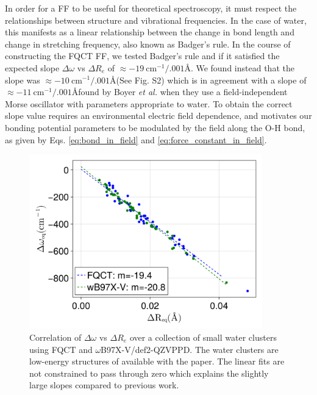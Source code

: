 \documentclass[journal=jctcce,manuscript=article]{achemso}
\begin{document}
In order for a FF to be useful for theoretical spectroscopy, it must respect the relationships between structure and vibrational frequencies. In the case of water, this manifests as a linear relationship between the change in bond length and change in  stretching frequency\cite{boyer2019beyond}, also known as Badger's rule.\cite{badger1934relation} In the course of constructing the FQCT FF, we tested Badger's rule and if it satisfied the expected slope $\Delta\omega$ vs $\Delta R_e$ of $\approx -19\ \mathrm{cm^{-1}/.001}$\AA\cite{boyer2019beyond}. We found instead that the slope was $\approx -10\ \mathrm{cm^{-1}/.001}$\AA (See Fig. S2) which is in agreement with a slope of $\approx -11\ \mathrm{cm^{-1}/.001}$\AA found by Boyer \textit{et al.} when they use a field-independent Morse oscillator with parameters appropriate to water. To obtain the correct slope value requires an environmental electric field dependence\cite{boyer2019beyond}, and motivates our bonding potential parameters to be modulated by the field along the O-H bond, as given by  Eqs. \ref{eq:bond_in_field} and \ref{eq:force_constant_in_field}. 
\begin{figure}[h]
  \includegraphics*[width=0.9\textwidth]{figures/badger_correlation_final.png}
  \caption{Correlation of $\Delta\omega$ vs $\Delta R_e$ over a collection
  of small water clusters using FQCT and $\omega$B97X-V/def2-QZVPPD.
  The water clusters are low-energy structures of  available
  with the paper. The linear fits are not constrained to pass through zero
  which explains the slightly large slopes compared to previous work.\cite{boyer2019beyond}
}
  \label{fig:badger2}
\end{figure}
\end{document}
